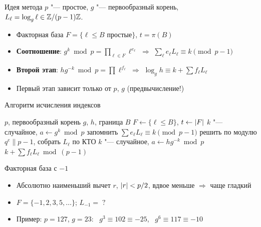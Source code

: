 \documentclass{ca-slides}
\begin{document}
\begin{canvasframe}{Идея метода}
  $p$ "--- простое, $g$ "--- первообразный корень, $L_\ell = \log_g \ell \in \mathbb{Z}/(p-1)\mathbb{Z}$.
  \begin{itemize}
    \item Факторная база $F = \{\ell \le B \text{ простые}\}$, $t = \pi(B)$
    \item \textbf{Соотношение}: $g^k \bmod p = \prod_{\ell \in F} \ell^{e_\ell}$
      $\Rightarrow$ $\sum_\ell e_\ell L_\ell \equiv k \pmod{p - 1}$
    \item \textbf{Второй этап}: $h g^{-k} \bmod p = \prod \ell^{f_\ell}$ $\Rightarrow$
      $\log_g h \equiv k + \sum f_\ell L_\ell$
    \item Первый этап зависит только от $p$, $g$ (предвычисление!)
  \end{itemize}
  \proofarea[0.2\textheight]
\end{canvasframe}

\begin{canvasframe}[shrink=8]{Алгоритм исчисления индексов}
  \begin{algorithmic}[1]
    \Require $p$, первообразный корень $g$, $h$, граница $B$
    \State $F \gets \{\ell \le B\}$, $t \gets \lvert F\rvert$
    \Repeat {}
      \State $k$ "--- случайное, $a \gets g^k \bmod p$
        \State запомнить $\sum e_\ell L_\ell \equiv k \pmod{p - 1}$
      \EndIf
    \State решить по модулю $q^e \parallel p - 1$, собрать $L_\ell$ по КТО
    \Repeat {}
      \State $k$ "--- случайное, $a \gets h g^{-k} \bmod p$
    \State \Return $k + \sum f_\ell L_\ell \bmod (p - 1)$
  \end{algorithmic}
\end{canvasframe}

\begin{canvasframe}{Факторная база с $-1$}
  \begin{itemize}
    \item Абсолютно наименьший вычет $r$, $\lvert r\rvert < p/2$, вдвое меньше $\Rightarrow$ чаще гладкий
    \item $F = \{-1, 2, 3, 5, \dots\}$; \quad $L_{-1} = \;?$
  \end{itemize}
  \penspace[0.12\textheight]
  \begin{itemize}
    \item Пример: $p = 127$, $g = 23$: \ $g^3 \equiv 102 \equiv -25$, \ $g^6 \equiv 117 \equiv -10$
  \end{itemize}
  \notearea[0.12\textheight]
\end{canvasframe}
\end{document}
